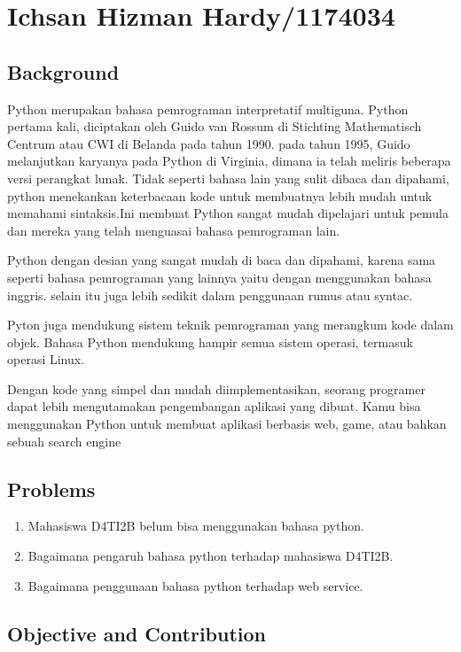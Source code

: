 \section{Ichsan Hizman Hardy/1174034}
\subsection{Background}
\par
Python merupakan bahasa pemrograman interpretatif multiguna. Python pertama kali, diciptakan oleh Guido van Rossum di Stichting Mathematisch Centrum atau CWI di Belanda pada tahun 1990. pada tahun 1995, Guido melanjutkan karyanya pada Python di Virginia, dimana ia telah meliris beberapa versi perangkat lunak.
Tidak seperti bahasa lain yang sulit dibaca dan dipahami, python menekankan keterbacaan kode untuk membuatnya lebih mudah untuk memahami sintaksis.Ini membuat Python sangat mudah dipelajari untuk pemula dan mereka yang telah menguasai bahasa pemrograman lain.
\par
Python dengan desian yang sangat mudah di baca dan dipahami, karena sama seperti bahasa pemrograman yang lainnya yaitu dengan menggunakan bahasa inggris. selain itu juga lebih sedikit dalam penggunaan rumus atau syntac.
\par
Pyton juga mendukung sistem teknik pemrograman yang merangkum kode dalam objek. Bahasa Python  mendukung hampir  semua sistem operasi, termasuk operasi Linux.
\par
Dengan kode yang simpel dan mudah diimplementasikan, seorang programer dapat lebih mengutamakan pengembangan aplikasi yang dibuat. Kamu bisa menggunakan Python untuk membuat aplikasi berbasis web, game, atau bahkan sebuah search engine
	
\subsection{Problems}
\begin{enumerate}
	\item Mahasiswa D4TI2B belum bisa menggunakan bahasa python.
	\item Bagaimana pengaruh bahasa python terhadap mahasiswa D4TI2B.
	\item Bagaimana penggunaan bahasa python terhadap web service.
\end{enumerate}
	
\subsection{Objective and Contribution}
